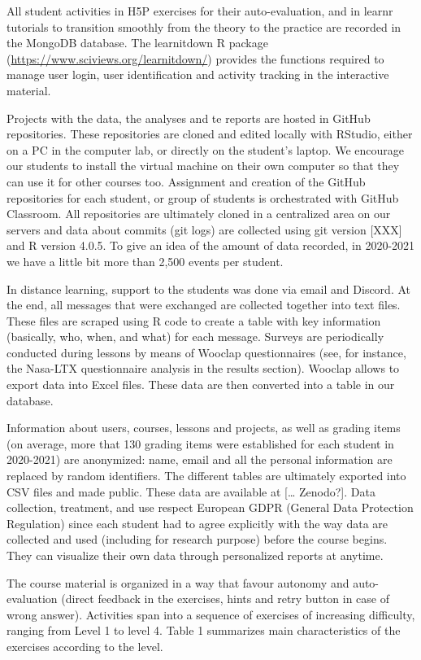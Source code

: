\documentclass[
]{article}
\begin{document}
All student activities in H5P exercises for their auto-evaluation, and
in learnr tutorials to transition smoothly from the theory to the
practice are recorded in the MongoDB database. The learnitdown R package
(\url{https://www.sciviews.org/learnitdown/}) provides the functions
required to manage user login, user identification and activity tracking
in the interactive material.

Projects with the data, the analyses and te reports are hosted in GitHub
repositories. These repositories are cloned and edited locally with
RStudio, either on a PC in the computer lab, or directly on the
student's laptop. We encourage our students to install the virtual
machine on their own computer so that they can use it for other courses
too. Assignment and creation of the GitHub repositories for each
student, or group of students is orchestrated with GitHub Classroom. All
repositories are ultimately cloned in a centralized area on our servers
and data about commits (git logs) are collected using git version
{[}XXX{]} and R version 4.0.5. To give an idea of the amount of data
recorded, in 2020-2021 we have a little bit more than 2,500 events per
student.

In distance learning, support to the students was done via email and
Discord. At the end, all messages that were exchanged are collected
together into text files. These files are scraped using R code to create
a table with key information (basically, who, when, and what) for each
message. Surveys are periodically conducted during lessons by means of
Wooclap questionnaires (see, for instance, the Nasa-LTX questionnaire
analysis in the results section). Wooclap allows to export data into
Excel files. These data are then converted into a table in our database.

Information about users, courses, lessons and projects, as well as
grading items (on average, more that 130 grading items were established
for each student in 2020-2021) are anonymized: name, email and all the
personal information are replaced by random identifiers. The different
tables are ultimately exported into CSV files and made public. These
data are available at {[}\ldots{} Zenodo?{]}. Data collection,
treatment, and use respect European GDPR (General Data Protection
Regulation) since each student had to agree explicitly with the way data
are collected and used (including for research purpose) before the
course begins. They can visualize their own data through personalized
reports at anytime.

The course material is organized in a way that favour autonomy and
auto-evaluation (direct feedback in the exercises, hints and retry
button in case of wrong answer). Activities span into a sequence of
exercises of increasing difficulty, ranging from Level 1 to level 4.
Table 1 summarizes main characteristics of the exercises according to
the level.
\end{document}
